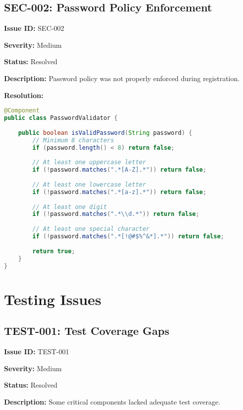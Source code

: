 \documentclass[12pt,a4paper]{article}
\begin{document}
\subsection{SEC-002: Password Policy Enforcement}

\textbf{Issue ID:} SEC-002

\textbf{Severity:} Medium

\textbf{Status:} Resolved

\textbf{Description:} Password policy was not properly enforced during registration.

\textbf{Resolution:}
\begin{lstlisting}[language=Java, caption=Password Validation]
@Component
public class PasswordValidator {
    
    public boolean isValidPassword(String password) {
        // Minimum 8 characters
        if (password.length() < 8) return false;
        
        // At least one uppercase letter
        if (!password.matches(".*[A-Z].*")) return false;
        
        // At least one lowercase letter
        if (!password.matches(".*[a-z].*")) return false;
        
        // At least one digit
        if (!password.matches(".*\\d.*")) return false;
        
        // At least one special character
        if (!password.matches(".*[!@#$%^&*].*")) return false;
        
        return true;
    }
}
\end{lstlisting}

\section{Testing Issues}

\subsection{TEST-001: Test Coverage Gaps}

\textbf{Issue ID:} TEST-001

\textbf{Severity:} Medium

\textbf{Status:} Resolved

\textbf{Description:} Some critical components lacked adequate test coverage.
\end{document}
